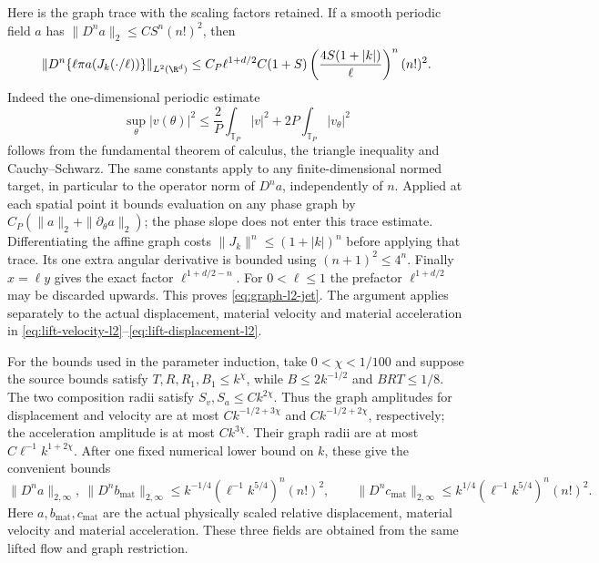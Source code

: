 Here is the graph trace with the scaling factors retained. If a smooth
periodic field $a$ has
$\|D^n a\|_2\le C S^n(n!)^2$, then
\begin{equation}\label{eq:graph-l2-jet}
 \left\|D^n\{\ell\pi a(J_k(\cdot/\ell))\}\right\|_{L^2(\R^d)}
 \le C_P\ell^{1+d/2}C(1+S)
       \left(\frac{4S(1+|k|)}\ell\right)^n(n!)^2.
\end{equation}
Indeed the one-dimensional periodic estimate
\[
 \sup_\theta|v(\theta)|^2
   \le\frac2P\int_{\mathbb T_P}|v|^2
                   +2P\int_{\mathbb T_P}|v_\theta|^2
\]
follows from the fundamental theorem of calculus, the triangle
inequality and Cauchy--Schwarz. The same constants apply to any
finite-dimensional normed target, in particular to the operator norm
of $D^n a$, independently of $n$. Applied at each spatial point it
bounds evaluation on any phase graph by
$C_P(\|a\|_2+\|\partial_\theta a\|_2)$; the phase slope does not
enter this trace estimate. Differentiating the affine graph costs
$\|J_k\|^n\le(1+|k|)^n$ before applying that trace. Its one extra
angular derivative is bounded using
$(n+1)^2\le4^n$. Finally $x=\ell y$ gives the exact factor
$\ell^{1+d/2-n}$. For $0<\ell\le1$ the prefactor
$\ell^{1+d/2}$ may be discarded upwards. This proves
\eqref{eq:graph-l2-jet}. The argument applies separately to the
actual displacement, material velocity and material acceleration in
\eqref{eq:lift-velocity-l2}--\eqref{eq:lift-displacement-l2}.

For the bounds used in the parameter induction, take $0<\chi<1/100$
and suppose the source bounds satisfy
$T,R,R_1,B_1\le k^\chi$, while $B\le2k^{-1/2}$ and
$BRT\le1/8$. The two composition radii satisfy
$S_v,S_a\le Ck^{2\chi}$. Thus the graph amplitudes for displacement
and velocity are at most $Ck^{-1/2+3\chi}$ and
$Ck^{-1/2+2\chi}$, respectively; the acceleration amplitude is at
most $Ck^{3\chi}$. Their graph radii are at most
$C\ell^{-1}k^{1+2\chi}$. After one fixed numerical lower bound on
$k$, these give the convenient bounds
\[
 \|D^n a\|_{2,\infty},\ \|D^n b_{\mathrm{mat}}\|_{2,\infty}
       \le k^{-1/4}(\ell^{-1}k^{5/4})^n(n!)^2,
 \qquad
 \|D^n c_{\mathrm{mat}}\|_{2,\infty}
       \le k^{1/4}(\ell^{-1}k^{5/4})^n(n!)^2.
\]
Here $a,b_{\mathrm{mat}},c_{\mathrm{mat}}$ are the actual physically scaled
relative displacement, material velocity and material acceleration.
These three fields are obtained from the same lifted flow and graph
restriction.

